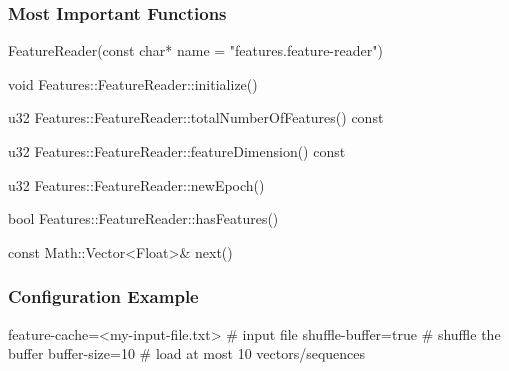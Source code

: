 \subsubsection*{Most Important Functions}

\begin{fdoc}{FeatureReader(const char* name = "features.feature-reader")}
\end{fdoc}

\begin{fdoc}{void Features::FeatureReader::initialize()}
\end{fdoc}

\begin{fdoc}{u32 Features::FeatureReader::totalNumberOfFeatures() const}
\end{fdoc}

\begin{fdoc}{u32 Features::FeatureReader::featureDimension() const}
\end{fdoc}

\begin{fdoc}{u32 Features::FeatureReader::newEpoch()}
\end{fdoc}

\begin{fdoc}{bool Features::FeatureReader::hasFeatures()}
\end{fdoc}

\begin{fdoc}{const Math::Vector<Float>\& next()}
\end{fdoc}

\subsubsection*{Configuration Example}

\begin{config}
feature-cache=<my-input-file.txt>   # input file
shuffle-buffer=true                 # shuffle the buffer
buffer-size=10                      # load at most 10 vectors/sequences
\end{config}

